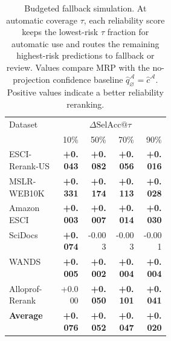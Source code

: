 \begin{table}[t]
\centering
\small
\caption{Budgeted fallback simulation. At automatic coverage \(\tau\), each reliability score keeps the lowest-risk \(\tau\) fraction for automatic use and routes the remaining highest-risk predictions to fallback or review. Values compare MRP with the no-projection confidence baseline \(\hat{q}_{\varnothing}^{\mathcal{A}}=\hat{c}^{\mathcal{A}}\). Positive values indicate a better reliability reranking.}
\label{tab:budgeted_fallback}
\setlength{\tabcolsep}{3.8pt}
\begin{tabular}{@{}p{0.31\linewidth}rrrr@{}}
\toprule
\multirow{2}{*}{Dataset} & \multicolumn{4}{c}{\(\Delta\mathrm{SelAcc}@\tau\)} \\
\cmidrule(l){2-5}
 & 10\% & 50\% & 70\% & 90\% \\
\midrule
ESCI-Rerank-US & \textbf{+0.043} & \textbf{+0.082} & \textbf{+0.056} & \textbf{+0.016} \\
MSLR-WEB10K & \textbf{+0.331} & \textbf{+0.174} & \textbf{+0.113} & \textbf{+0.028} \\
Amazon ESCI & \textbf{+0.003} & \textbf{+0.007} & \textbf{+0.014} & \textbf{+0.030} \\
SciDocs & \textbf{+0.074} & -0.003 & -0.003 & -0.001 \\
WANDS & \textbf{+0.005} & \textbf{+0.002} & \textbf{+0.004} & \textbf{+0.004} \\
Alloprof-Rerank & +0.000 & \textbf{+0.050} & \textbf{+0.101} & \textbf{+0.041} \\
\midrule
\textbf{Average} & \textbf{+0.076} & \textbf{+0.052} & \textbf{+0.047} & \textbf{+0.020} \\
\bottomrule
\end{tabular}
\end{table}
